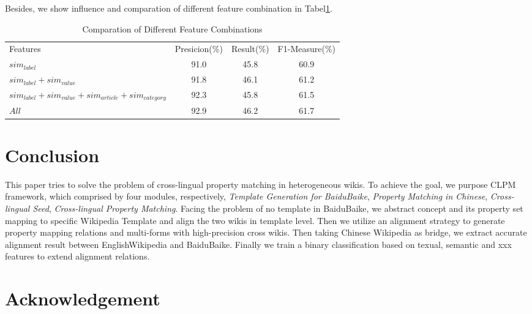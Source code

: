 \documentclass[runningheads,a4paper]{llncs}
\begin{document}
Besides, we show influence and comparation of different feature combination in Tabel\ref{tab:feature-compare}.

\begin{table}[htb]
  \centering
  \caption{Comparation of Different Feature Combinations}
  \label{tab:feature-compare}
    \begin{tabular}{lccc}
      {Features} & {Presicion(\%)} &  {Result(\%)} & {F1-Measure(\%)}  \\
       $sim_{label}$& 91.0       & 45.8 & 60.9 \\
       $sim_{label}+sim_{value}$ & 91.8 & 46.1 & 61.2  \\
       $sim_{label}+sim_{value}+sim_{article}+sim_{category}$ & 92.3 & 45.8 & 61.5  \\
       $All$ & 92.9 & 46.2 & 61.7 \\
    \end{tabular}
\end{table}

\section{Conclusion}
This paper tries to solve the problem of cross-lingual property matching in heterogeneous wikis. To achieve the goal, we purpose CLPM framework, which comprised by four modules, respectively, \textit{Template Generation for BaiduBaike}, \textit{Property Matching in Chinese}, \textit{Cross-lingual Seed}, \textit{Cross-lingual Property Matching}. Facing the problem of no template in BaiduBaike, we abstract concept and its property set mapping to specific Wikipedia Template and align the two wikis in template level. Then we utilize an alignment strategy to generate property mapping relations and multi-forms with high-precision cross wikis. Then taking Chinese Wikipedia as bridge, we extract accurate alignment result between EnglishWikipedia and BaiduBaike. Finally we train a binary classification based on texual, semantic and xxx features to extend alignment relations.

\section*{Acknowledgement}
\end{document}
